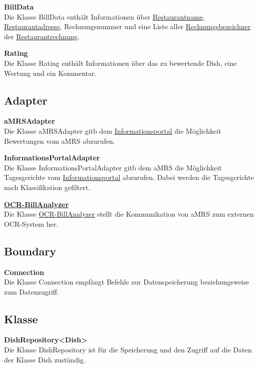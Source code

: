 \noindent \textbf{BillData} \\
Die Klasse BillData enthält Informationen über \hyperref[gls:restaurantname]{Restaurantname}, \hyperref[gls:restaurantadresse]{Restaurantadresse}, Rechnungsnummer und eine Liste aller
\hyperref[gls:Rechnungsbezeichner]{Rechnungsbezeichner} der \hyperref[gls:restaurantRechnung]{Restaurantrechnung}.
\newline

\noindent \textbf{Rating} \\
Die Klasse Rating enthält Informationen über das zu bewertende Dish, eine Wertung und ein Kommentar.

\subsection*{Adapter}
\noindent \textbf{aMRSAdapter}\\
Die Klasse aMRSAdapter gitb dem \hyperref[gls:informationsportal]{Informationsportal} die Möglichkeit Bewertungen vom \ac{aMRS} abzurufen.
\newline

\noindent \textbf{InformationsPortalAdapter}\\
Die Klasse InformationsPortalAdapter gitb dem \ac{aMRS} die Möglichkeit Tagesgerichte vom \hyperref[gls:informationsportal]{Informationsportal} abzurufen.
Dabei werden die Tagesgerichte nach Klassifikation gefiltert.
\newline

\noindent \hyperref[gls:ocr-BillAnalyzer]{\textbf{OCR-BillAnalyzer}}\\
Die Klasse \hyperref[gls:ocr-BillAnalyzer]{OCR-BillAnalyzer} stellt die Kommunikation von \ac{aMRS} zum externen OCR-System her.


\subsection*{Boundary}
\noindent \textbf{Connection}\\
Die Klasse Connection empfängt Befehle zur Datenspeicherung beziehungsweise zum Datenzugriff.

\subsection*{Klasse}
\noindent \textbf{DishRepository<Dish>}\\
Die Klasse DishRepository ist für die Speicherung und den Zugriff auf die Daten der Klasse Dish zuständig.
\newline

